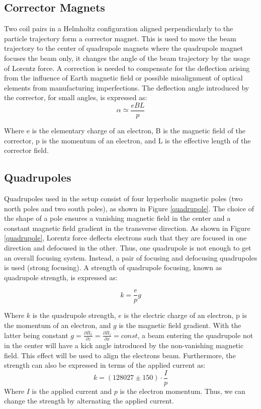 \documentclass[12pt]{article}
\begin{document}
\subsection*{Corrector Magnets}
Two coil pairs in a Helmholtz configuration aligned perpendicularly to the particle trajectory form a corrector magnet. This is used to move the beam trajectory to the center of quadrupole magnets where the quadrupole magnet focuses the beam only, it changes the angle of the beam trajectory by the usage of Lorentz force. A correction is needed to compensate for the deflection arising from the influence of Earth magnetic field or possible misalignment of optical elements from manufacturing imperfections.  
The deflection angle introduced by the corrector, for small angles, is expressed as:
\begin{equation}
    \alpha \simeq \frac{eBL}{p}
\end{equation}

Where e is the elementary charge of an electron, B is the magnetic field of the corrector, p is the momentum of an electron, and L is the effective length of the corrector field. 
\subsection*{Quadrupoles}
Quadrupoles used in the setup consist of four hyperbolic magnetic poles (two north poles and two south poles), as shown in Figure \ref{quadrupole}. The choice of the shape of a pole ensures a vanishing magnetic field in the center and a constant magnetic field gradient in the transverse direction. As shown in Figure \ref{quadrupole}, Lorentz force deflects electrons such that they are focused in one direction and defocused in the other. Thus, one quadrupole is not enough to get an overall focusing system. Instead, a pair of focusing and defocusing quadrupoles is used (strong focusing). 
A strength of quadrupole focusing, known as quadrupole strength, is expressed as:

\begin{equation}
    k = \frac{e}{p} g
\end{equation}

Where $k$ is the quadrupole strength, $e$ is the electric charge of an electron, p is the momentum of an electron, and $g$ is the magnetic field gradient. With the latter being constant $g = \frac{\partial B_x}{\partial z} = \frac{\partial B_z}{\partial x} = const$, a beam entering the quadrupole not in the center will have a kick angle introduced by the non-vanishing magnetic field. This effect will be used to align the electrons beam. Furthermore, the strength can also be expressed in terms of the applied current as:
\begin{equation}
    k = (128027 \pm 150) \cdot \frac{I}{p}
\end{equation}
Where $I$ is the applied current and $p$ is the electron momentum. Thus, we can change the strength by alternating the applied current. 
\end{document}
